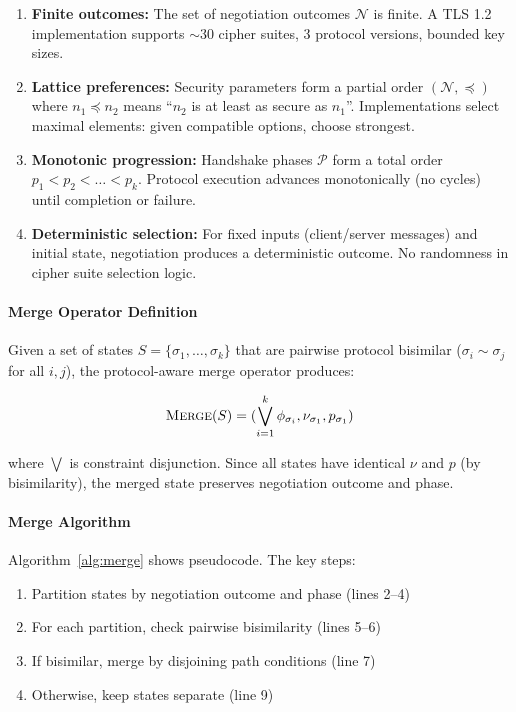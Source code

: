 \documentclass[10pt,twocolumn]{article}
\begin{document}
\begin{enumerate}[leftmargin=*,noitemsep]
\item \textbf{Finite outcomes:} The set of negotiation outcomes $\mathcal{N}$ is finite. A TLS 1.2 implementation supports $\sim$30 cipher suites, 3 protocol versions, bounded key sizes.

\item \textbf{Lattice preferences:} Security parameters form a partial order $(\mathcal{N}, \preceq)$ where $n_1 \preceq n_2$ means ``$n_2$ is at least as secure as $n_1$''. Implementations select maximal elements: given compatible options, choose strongest.

\item \textbf{Monotonic progression:} Handshake phases $\mathcal{P}$ form a total order $p_1 < p_2 < \ldots < p_k$. Protocol execution advances monotonically (no cycles) until completion or failure.

\item \textbf{Deterministic selection:} For fixed inputs (client/server messages) and initial state, negotiation produces a deterministic outcome. No randomness in cipher suite selection logic.
\end{enumerate}

\paragraph{Merge Operator Definition}
Given a set of states $S = \{\sigma_1, \ldots, \sigma_k\}$ that are pairwise protocol bisimilar ($\sigma_i \sim \sigma_j$ for all $i,j$), the protocol-aware merge operator produces:

\begin{equation}
\textsc{Merge}(S) = (\bigvee_{i=1}^{k} \phi_{\sigma_i}, \nu_{\sigma_1}, p_{\sigma_1})
\end{equation}

\noindent where $\bigvee$ is constraint disjunction. Since all states have identical $\nu$ and $p$ (by bisimilarity), the merged state preserves negotiation outcome and phase.

\paragraph{Merge Algorithm}
Algorithm~\ref{alg:merge} shows pseudocode. The key steps:
\begin{enumerate}[leftmargin=*,noitemsep]
\item Partition states by negotiation outcome and phase (lines 2--4)
\item For each partition, check pairwise bisimilarity (lines 5--6)
\item If bisimilar, merge by disjoining path conditions (line 7)
\item Otherwise, keep states separate (line 9)
\end{enumerate}
\end{document}

